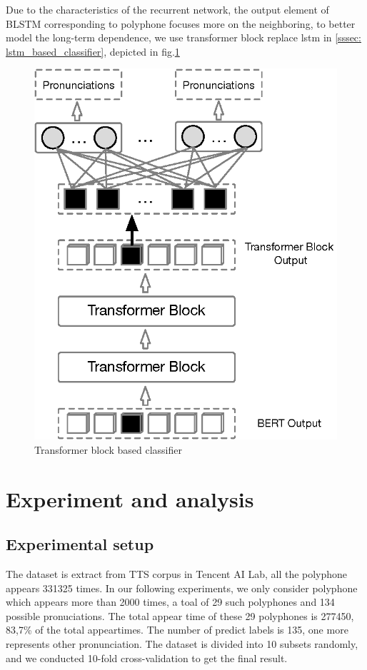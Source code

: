\documentclass[a4paper]{article}
\begin{document}
Due to the characteristics of the recurrent network, the output element of BLSTM corresponding to polyphone focuses more on the neighboring, to better model the long-term dependence, we use transformer block replace lstm in \ref{sssec: lstm_based_classifier}, depicted in fig.\ref{fig:sa}

\begin{figure}[t]
	\centering
	\includegraphics[scale=0.5]{pics/sa2.eps}
	\caption{Transformer block based classifier}
	\label{fig:sa}
\end{figure}

\section{Experiment and analysis}

\subsection{Experimental setup}

The dataset is extract from TTS corpus in Tencent AI Lab, all the polyphone appears 331325 times. In our following experiments, we only consider polyphone which appears more than 2000 times, a toal of 29 such polyphones and 134 possible pronuciations. The total appear time of these 29 polyphones is 277450, 83,7\% of the total appeartimes. The number of predict labels is 135, one more represents other pronunciation. The dataset is divided into 10 subsets randomly, and we conducted 10-fold cross-validation to get the final result. 
\end{document}
